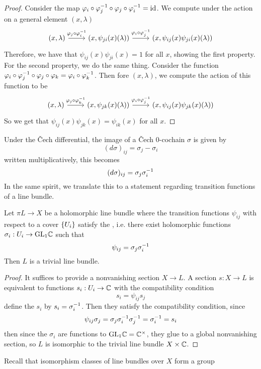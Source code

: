 \begin{proof}
Consider the map $\varphi_i\circ\varphi_j^{-1}\circ\varphi_j\circ\varphi_i^{-1} = \operatorname{id}$.
We compute under the action on a general element $(x,\lambda)$
\[\begin{tikzcd}
(x,\lambda) \ar[r, "\varphi_j\circ\varphi_i\inv"] & (x,\psi_{ji}(x)(\lambda))
\ar[r, "\varphi_i\circ\varphi_j\inv"] & (x,\psi_{ij}(x)\psi_{ji}(x)(\lambda))
\end{tikzcd}\]
Therefore, we have that $\psi_{ij}(x)\psi_{ji}(x) = 1$ for all $x$, showing the
first property. For the second property, we do the same thing. Consider
the function
$\varphi_i\circ\varphi_j^{-1}\circ\varphi_j\circ\varphi_k = \varphi_i\circ\varphi_k^{-1}$.
Then fore $(x,\lambda)$, we compute the action of this function to be
\[\begin{tikzcd}
(x,\lambda) \ar[r, "\varphi_j\circ\varphi_k\inv"] & (x,\psi_{jk}(x)(\lambda))
\ar[r, "\varphi_i\circ\varphi_j\inv"] & (x,\psi_{ij}(x)\psi_{jk}(x)(\lambda))
\end{tikzcd}\]
So we get that $\psi_{ij}(x)\psi_{jk}(x) = \psi_{ik}(x)$ for all $x$.
\end{proof}
%
Under the \v{C}ech differential, the image of a \v{C}ech $0$-cochain $\sigma$ is given
by
\[
(d\sigma)_{ij} = \sigma_j - \sigma_i
\]
written multiplicatively, this becomes
\[
(d\sigma)_{ij} = \sigma_j\sigma_i^{-1}
\]
In the same spirit, we translate this to a statement regarding transition functions
of a line bundle.
%
\begin{prop}
Let $\pi L \to X$ be a holomorphic line bundle where the transition functions
$\psi_{ij}$ with respect to a cover $\left\lbrace U_i \right\rbrace$ satisfy the ,
i.e. there exist holomorphic functions $\sigma_i : U_i \to \mathrm{GL}_1\mathbb{C}$ such that
\[
\psi_{ij} = \sigma_j\sigma_i^{-1}
\]
Then $L$ is a trivial line bundle.
\end{prop}
%
\begin{proof}
It suffices to provide a nonvanishing section $X \to L$. A section $s : X \to L$ is
equivalent to functions $s_i : U_i \to \mathbb{C}$ with the compatibility condition
\[
s_i = \psi_{ij}s_j
\]
define the $s_i$ by $s_i = \sigma_i^{-1}$. Then they satisfy the compatibility condition,
since
\[
\psi_{ij}\sigma_j = \sigma_j\sigma_i^{-1}\sigma_j^{-1} = \sigma_i^{-1} = s_i
\]
then since the $\sigma_i$ are functions to $\mathrm{GL}_1\mathbb{C} = \mathbb{C}^\times$, they glue to
a global nonvanishing section, so $L$ is isomorphic to the trivial line bundle
$X \times \mathbb{C}$.
\end{proof}
%
Recall that isomorphism classes of line bundles over $X$ form a group
